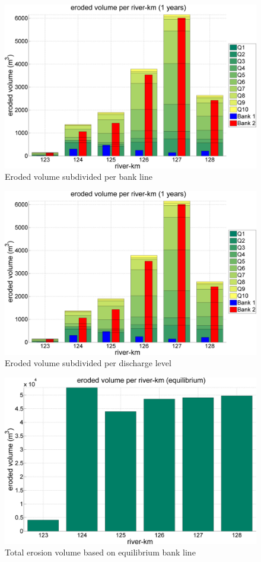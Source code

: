 \begin{figure}
\includegraphics[width=\textwidth]{figures/Fig2-6.png}
\caption{Eroded volume subdivided per bank line}
\label{Fig2.6a}
\end{figure}

\begin{figure}
\includegraphics[width=\textwidth]{figures/Fig2-6.png}
\caption{Eroded volume subdivided per discharge level}
\label{Fig2.6b}
\end{figure}

\begin{figure}
\includegraphics[width=\textwidth]{figures/Fig2-7.png}
\caption{Total erosion volume based on equilibrium bank line}
\label{Fig2.7}
\end{figure}

